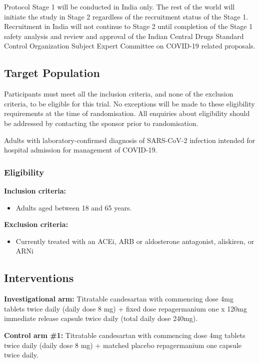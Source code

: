 \documentclass[11pt,parskip=full-]{scrartcl}
\begin{document}
Protocol Stage 1 will be conducted in India only. The rest of the world will initiate the study in Stage 2 regardless of the recruitment status of the Stage 1. Recruitment in India will not continue to Stage 2 until completion of the Stage 1 safety analysis and review and approval of the Indian Central Drugs Standard Control Organization Subject Expert Committee on COVID-19 related proposals.


\subsection{Target Population}
Participants must meet all the inclusion criteria, and none of the exclusion criteria, to be eligible for this trial. No exceptions will be made to these eligibility requirements at the time of randomisation. All enquiries about eligibility should be addressed by contacting the sponsor prior to randomisation.

Adults with laboratory-confirmed diagnosis of SARS-CoV-2 infection intended for hospital admission for management of COVID-19.

\subsubsection{Eligibility}

\textbf{Inclusion criteria:}
\begin{itemize}
    \item Adults aged between 18 and 65 years.
\end{itemize}

\textbf{Exclusion criteria:}
\begin{itemize}
    \item Currently treated with an ACEi, ARB or aldosterone antagonist, aliskiren, or ARNi
\end{itemize}

\subsection{Interventions}
\textbf{Investigational arm:} Titratable candesartan with commencing dose 4mg tablets twice daily (daily dose 8 mg) + fixed dose repagermanium one x 120mg immediate release capsule twice daily (total daily dose 240mg).

\textbf{Control arm \#1:} Titratable candesartan with commencing dose 4mg tablets twice daily (daily dose 8 mg) + matched placebo repagermanium one capsule twice daily.
\end{document}
